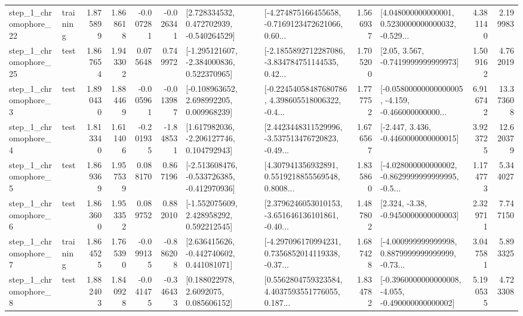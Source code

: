 \begin{tabular}{llrrrrllrlrr}
    step\_1\_chromophore\_22 &  training &      1.875899 &    1.868618 &     -0.007281 & -0.026341 &    [2.728334532, 0.472702939, -0.540264529] &  [-4.274875166455658, -0.7169123472621066, 0.60... &       1.566937 &  [4.048000000000001, 0.5230000000000032, -0.529... &            4.381140 &          2.199983 \\
    step\_1\_chromophore\_25 &      test &      1.867654 &    1.943302 &      0.075648 &  0.749972 &   [-1.295121607, -2.384000836, 0.522370965] &  [-2.1855892712287086, -3.834784751144535, 0.42... &       1.705200 &                 [2.05, 3.567, -0.7419999999999973] &            1.509162 &          4.762019 \\
     step\_1\_chromophore\_3 &      test &      1.890430 &    1.884469 &     -0.005961 & -0.013987 &    [-0.108963652, 2.698992205, 0.009968239] &  [-0.22454058487680786, 4.398605518006322, -0.4... &       1.777752 &  [-0.05800000000000005, -4.159, -0.466000000000... &            6.916742 &         13.373608 \\
     step\_1\_chromophore\_4 &      test &      1.813340 &    1.611406 &     -0.201935 & -1.848531 &    [1.617982036, -2.206127746, 0.104792943] &  [2.4423448311529996, -3.537513476720823, -0.49... &       1.676567 &               [-2.447, 3.436, -0.4460000000000015] &            3.923725 &         12.620379 \\
     step\_1\_chromophore\_5 &      test &      1.869369 &    1.957539 &      0.088170 &  0.867196 &  [-2.513608476, -0.533726385, -0.412970936] &  [4.307941356932891, 0.5519218855569548, 0.8008... &       1.835860 &  [-4.028000000000002, -0.8629999999999995, -0.5... &            1.174773 &          5.344027 \\
     step\_1\_chromophore\_6 &      test &      1.863600 &    1.953352 &      0.089752 &  0.882010 &    [-1.552075609, 2.428958292, 0.592212545] &  [2.3796246053010153, -3.651646136101861, -0.40... &       1.487802 &                [2.324, -3.38, -0.9450000000000003] &            2.329711 &          7.747150 \\
     step\_1\_chromophore\_7 &  training &      1.864525 &    1.765390 &     -0.099135 & -0.886208 &    [2.636415626, -0.442740602, 0.441081071] &  [-4.297096170994231, 0.7356852014119338, -0.37... &       1.687428 &  [-4.000999999999998, 0.8879999999999999, -0.73... &            3.047581 &          5.893325 \\
     step\_1\_chromophore\_8 &      test &      1.882403 &    1.840928 &     -0.041475 & -0.346433 &       [0.188022978, 2.6092075, 0.085606152] &  [0.5562804759323584, 4.4037593551776055, 0.187... &       1.834782 &  [-0.3960000000000008, -4.055, -0.490000000000002] &            5.190535 &          4.723308 \\

\end{tabular}
